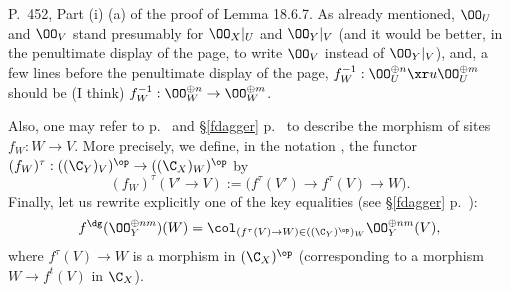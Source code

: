 \documentclass[12pt]{article}
\theoremstyle{remark}
\theoremstyle{definition}
\begin{document}


\begin{s}
P.~452, Part (i) (a) of the proof of Lemma 18.6.7. As already mentioned, $\OO_U$ and $\OO_V$ stand presumably for $\OO_X|_U$ and $\OO_Y|_V$ (and it would be better, in the penultimate display of the page, to write $\OO_V$ instead of $\OO_Y|_V$), and, a few lines before the penultimate display of the page, $f_W^{-1}:\OO_U^{\oplus n}\xr u\OO_U^{\oplus m}$ should be (I think) $f_W^{-1}:\OO_W^{\oplus n}\to\OO_W^{\oplus m}$. 

Also, one may refer to  p.~ and \S\ref{fdagger} p.~ to describe the morphism of sites $f_W:W\to V$. More precisely, we define, in the notation , the functor $(f_W)^\tau:((\C_Y)_V)^{\op}\to((\C_X)_W)^{\op}$ by
$$
(f_W)^\tau(V'\to V):=\big(f^\tau(V')\to f^\tau(V)\to W\big).
$$
Finally, let us rewrite explicitly one of the key equalities (see \S\ref{fdagger} p.~): 
$$
f^\dg(\OO_Y^{\oplus nm})(W)=\col_{(f^\tau(V)\to W)\in((\C_Y)^{\op})_W}\OO_Y^{\oplus nm}(V),
$$ 
where $f^\tau(V)\to W$ is a morphism in $(\C_X)^{\op}$ (corresponding to a morphism $W\to f^t(V)$ in $\C_X$).
\end{s}
\printindex
\end{document}
